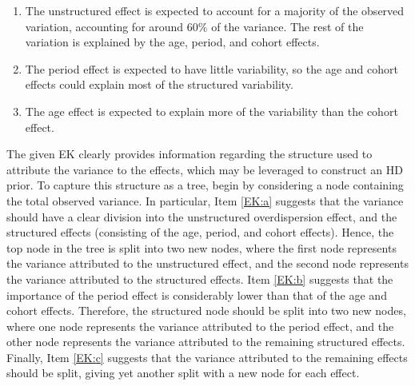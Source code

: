 \begin{enumerate}[label = (\alph*)]
    \item The unstructured effect is expected to account for a majority of the observed variation, accounting for around $60\%$ of the variance. The rest of the variation is explained by the age, period, and cohort effects. \label{EK:a}
    \item The period effect is expected to have little variability, so the age and cohort effects could explain most of the structured variability. \label{EK:b}
    \item The age effect is expected to explain more of the variability than the cohort effect. \label{EK:c}
\end{enumerate}
The given EK clearly provides information regarding the structure used to attribute the variance to the effects, which may be leveraged to construct an HD prior. To capture this structure as a tree, begin by considering a node containing the total observed variance. In particular, Item \ref{EK:a} suggests that the variance should have a clear division into the unstructured overdispersion effect, and the structured effects (consisting of the age, period, and cohort effects). Hence, the top node in the tree is split into two new nodes, where the first node represents the variance attributed to the unstructured effect, and the second node represents the variance attributed to the structured effects. Item \ref{EK:b} suggests that the importance of the period effect is considerably lower than that of the age and cohort effects. Therefore, the structured node should be split into two new nodes, where one node represents the variance attributed to the period effect, and the other node represents the variance attributed to the remaining structured effects. Finally, Item \ref{EK:c} suggests that the variance attributed to the remaining effects should be split, giving yet another split with a new node for each effect. 

